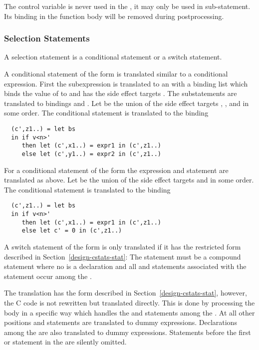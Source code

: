 The control variable  is never used in the , it may only be used in sub-statement.
Its binding in the function body will be removed during postprocessing.

\subsubsection{Selection Statements}

A selection statement is a conditional statement or a switch statement.

A conditional statement of the form  is translated similar to a conditional expression.
First the subexpression  is translated to an  with a binding list  which binds
the value of  to  and has the side effect targets .
The substatements are translated to bindings  and .
Let  be the union of the side effect targets , , and  in some order. The conditional
statement is translated to the binding
\begin{verbatim}
  (c',z1..) = let bs
  in if v<n>' 
     then let (c',x1..) = expr1 in (c',z1..)
     else let (c',y1..) = expr2 in (c',z1..)
\end{verbatim}

For a conditional statement of the form  the expression  and statement  are translated as
above. Let  be the union of the side effect targets  and  in some order. The conditional
statement is translated to the binding
\begin{verbatim}
  (c',z1..) = let bs
  in if v<n>' 
     then let (c',x1..) = expr1 in (c',z1..)
     else let c' = 0 in (c',z1..)
\end{verbatim}

A switch statement of the form  is only translated if it has the restricted form described in 
Section~\ref{design-cstats-stat}: The statement  must be a compound statement  where no 
is a declaration and all  and  statements associated with the  statement occur among the 
. 

The translation has the form described in Section~\ref{design-cstats-stat}, however, the C code is not rewritten but translated
directly. This is done by processing the body  in a specific way which handles the  and 
statements among the . At all other positions  and  statements are translated to dummy expressions.
Declarations among the  are also translated to dummy expressions. Statements before the first  or 
statement in the  are silently omitted.

